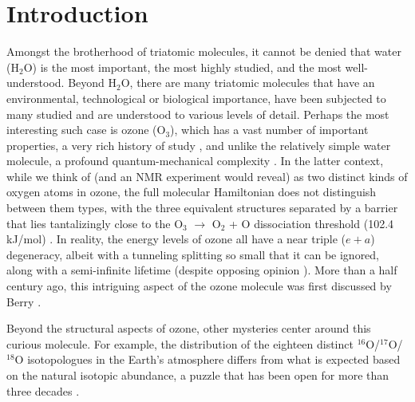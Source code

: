 \documentclass[
12pt,
a4paper,
prb,
superscriptaddress,
]{revtex4}
\begin{document}
\maketitle

\section{Introduction}

Amongst the brotherhood of triatomic molecules, it cannot be denied that water
(H$_2$O) is the most important, the most highly studied, and the most
well-understood.  Beyond H$_2$O, there are many triatomic molecules that have
an environmental, technological or biological importance, have been subjected
to many studied and are understood to various levels of detail.  Perhaps the
most interesting such case is ozone (O$_3$), which has a vast number of
important properties, a very rich history of study \cite{chappuis}, and 
unlike the relatively simple water molecule, a profound quantum-mechanical
complexity \cite{Babikov:anomalousOzone:2003}.  In the latter context, while
we think of (and an NMR experiment would reveal) as two distinct kinds of
oxygen atoms in ozone, the full molecular Hamiltonian does not distinguish
between them types, with the three equivalent structures separated by a
barrier that lies tantalizingly close to the O$_3$ $\rightarrow$ O$_2$ + O
dissociation threshold (102.4 kJ/mol) \cite{Ruscis:ATcT:2022}. In reality, the
energy levels of ozone all have a near triple ($e+a$) degeneracy, albeit with
a tunneling splitting so small that it can be ignored, along with a
semi-infinite lifetime (despite opposing opinion
\cite{Boggs:BerryOzone:2006}).   More than a half century ago, this intriguing
aspect of the ozone molecule was first discussed by Berry
\cite{Berry:Ozone:1960}.

Beyond the structural aspects of ozone, other mysteries center around this
curious molecule.  For example, the distribution of the eighteen distinct
$^{16}$O/$^{17}$O/$^{18}$O isotopologues in the Earth's atmosphere differs
from what is expected based on the natural isotopic abundance, a puzzle that
has been open for more than three decades
\cite{Mauersberger:OzoneMystery:1990}. 
\end{document}
